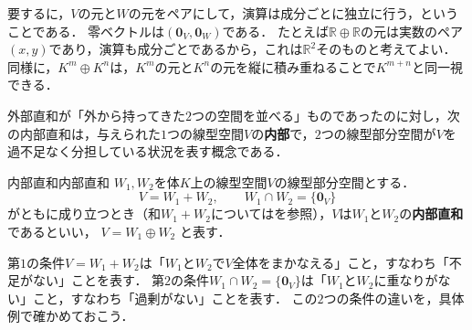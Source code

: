 要するに，$V$の元と$W$の元をペアにして，演算は成分ごとに独立に行う，ということである．
零ベクトルは$(\bm{0}_V,\bm{0}_W)$である．
たとえば$\mathbb{R}\oplus\mathbb{R}$の元は実数のペア$(x,y)$であり，演算も成分ごとであるから，これは$\mathbb{R}^2$そのものと考えてよい．
同様に，$K^m\oplus K^n$は，$K^m$の元と$K^n$の元を縦に積み重ねることで$K^{m+n}$と同一視できる．

外部直和が「外から持ってきた$2$つの空間を並べる」ものであったのに対し，次の内部直和は，与えられた$1$つの線型空間$V$の\textbf{内部}で，$2$つの線型部分空間が$V$を過不足なく分担している状況を表す概念である．

\begin{definition}{内部直和}{内部直和}
  $W_1, W_2$を体$K$上の線型空間$V$の線型部分空間とする．
  \[
    V = W_1 + W_2,
    \qquad
    W_1 \cap W_2 = \{\bm{0}_V\}
  \]
  がともに成り立つとき（和$W_1 + W_2$についてはを参照），$V$は$W_1$と$W_2$の\textbf{内部直和}であるといい，
  $V = W_1 \oplus W_2$
  と表す．
\end{definition}

第$1$の条件$V=W_1+W_2$は「$W_1$と$W_2$で$V$全体をまかなえる」こと，すなわち「不足がない」ことを表す．
第$2$の条件$W_1\cap W_2=\{\bm{0}_V\}$は「$W_1$と$W_2$に重なりがない」こと，すなわち「過剰がない」ことを表す．
この$2$つの条件の違いを，具体例で確かめておこう．

